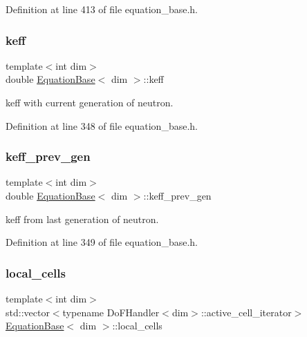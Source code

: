 Definition at line 413 of file equation\+\_\+base.\+h.

\mbox{\label{class_equation_base_ab3cf94dc329f486555f89bdb0dd94ed6}} 
\subsubsection{\texorpdfstring{keff}{keff}}
{\footnotesize\ttfamily template$<$int dim$>$ \\
double \hyperlink{class_equation_base}{Equation\+Base}$<$ dim $>$\+::keff\hspace{0.3cm}{\ttfamily [protected]}}



keff with current generation of neutron. 



Definition at line 348 of file equation\+\_\+base.\+h.

\mbox{\label{class_equation_base_a80de7bca9496a5739f842ed154ecd274}} 
\subsubsection{\texorpdfstring{keff\+\_\+prev\+\_\+gen}{keff\_prev\_gen}}
{\footnotesize\ttfamily template$<$int dim$>$ \\
double \hyperlink{class_equation_base}{Equation\+Base}$<$ dim $>$\+::keff\+\_\+prev\+\_\+gen\hspace{0.3cm}{\ttfamily [protected]}}



keff from last generation of neutron. 



Definition at line 349 of file equation\+\_\+base.\+h.

\mbox{\label{class_equation_base_a60d687f69ae6fd56881c15435e91e4e5}} 
\subsubsection{\texorpdfstring{local\+\_\+cells}{local\_cells}}
{\footnotesize\ttfamily template$<$int dim$>$ \\
std\+::vector$<$typename Do\+F\+Handler$<$dim$>$\+::active\+\_\+cell\+\_\+iterator$>$ \hyperlink{class_equation_base}{Equation\+Base}$<$ dim $>$\+::local\+\_\+cells\hspace{0.3cm}{\ttfamily [protected]}}



